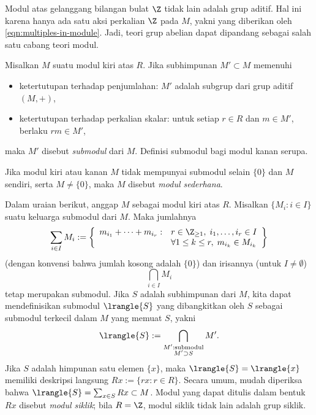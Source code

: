 \begin{example}\label{eg:Z-modules}
	Modul atas gelanggang bilangan bulat $\Z$ tidak lain adalah grup aditif. Hal ini karena hanya ada satu aksi perkalian $\Z$ pada $M$, yakni yang diberikan oleh \eqref{eqn:multiples-in-module}. Jadi, teori grup abelian dapat dipandang sebagai salah satu cabang teori modul.
\end{example}

\begin{definition}\label{def:submodule}
	Misalkan $M$ suatu modul kiri atas $R$. Jika subhimpunan $M' \subset M$ memenuhi
	\begin{itemize}
		\item ketertutupan terhadap penjumlahan: $M'$ adalah subgrup dari grup aditif $(M, +)$,
		\item ketertutupan terhadap perkalian skalar: untuk setiap $r \in R$ dan $m \in M'$, berlaku $rm \in M'$,
	\end{itemize}
	maka $M'$ disebut \emph{submodul} dari $M$. Definisi submodul bagi modul kanan serupa.

	Jika modul kiri atau kanan $M$ tidak mempunyai submodul selain $\{0\}$ dan $M$ sendiri, serta $M \neq \{0\}$, maka $M$ disebut \emph{modul sederhana}.
\end{definition}

Dalam uraian berikut, anggap $M$ sebagai modul kiri atas $R$. Misalkan $\{M_i: i \in I\}$ suatu keluarga submodul dari $M$. Maka jumlahnya
\[ \sum_{i \in I} M_i := \left\{ 
	\begin{array}{ll}
		m_{i_1} + \cdots + m_{i_r} : & r \in \Z_{\geq 1}, \; i_1, \ldots, i_r \in I \\
		& \forall 1 \leq k \leq r, \; m_{i_k} \in M_{i_k}
	\end{array} \right\} \]
(dengan konvensi bahwa jumlah kosong adalah $\{0\}$) dan irisannya (untuk $I \neq \emptyset$)
\[ \bigcap_{i \in I} M_i \]
tetap merupakan submodul. Jika $S$ adalah subhimpunan dari $M$, kita dapat mendefinisikan submodul $\lrangle{S}$ yang dibangkitkan oleh $S$ sebagai submodul terkecil dalam $M$ yang memuat $S$, yakni
\[ \lrangle{S} := \bigcap_{\substack{M': \text{submodul} \\ M' \supset S}} M'. \]
Jika $S$ adalah himpunan satu elemen $\{x\}$, maka $\lrangle{S} = \lrangle{x}$ memiliki deskripsi langsung $Rx := \{rx : r \in R\}$. Secara umum, mudah diperiksa bahwa $\lrangle{S} = \sum_{x \in S} Rx \subset M$. Modul yang dapat ditulis dalam bentuk $Rx$ disebut \emph{modul siklik}; bila $R=\Z$, modul siklik tidak lain adalah grup siklik.

